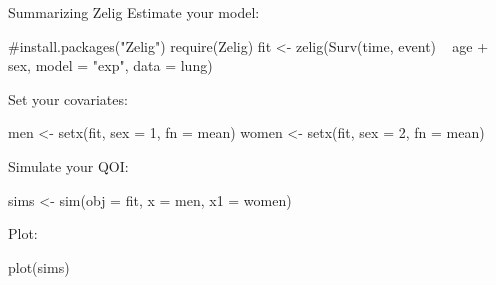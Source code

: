 \documentclass{beamer}
\newcommand\bblue[1]{{\color{blue}\textbf{#1}}}
\newcommand\bgreen[1]{{\color{olive}\textbf{#1}}}
\begin{document}
\begin{frame}[fragile]{Summarizing Zelig}
\footnotesize
Estimate your model:\\
\pause
\begin{semiverbatim}
#install.packages("Zelig")
require(Zelig)
fit <- zelig(Surv(time, event) ~ age + sex,
             model = "exp",
             data = lung)
\end{semiverbatim}
\pause
Set your covariates:\\
\pause
\begin{semiverbatim}
men <- setx(fit, sex = 1, fn = mean)
women <- setx(fit, sex = 2, fn = mean)
\end{semiverbatim}
\pause
Simulate your QOI:\\
\pause
\begin{semiverbatim}
sims <- sim(obj = fit, x = men, x1 = women)
\end{semiverbatim}
\pause
Plot:\\ 
\pause
\begin{semiverbatim}
plot(sims)
\end{semiverbatim}
\end{frame}

\end{document}
